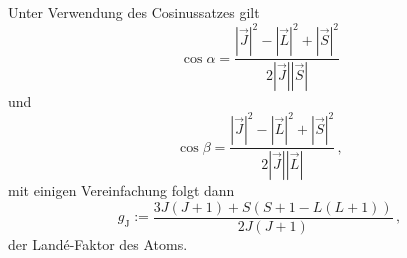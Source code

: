 Unter Verwendung des Cosinussatzes gilt
\begin{equation*}
    \cos\alpha = \dfrac{|\vec{J}|^2 - |\vec{L}|^2 + |\vec{S}|^2}{2|\vec{J}| |\vec{S}|}
\end{equation*}
und
\begin{equation*}
    \cos\beta = \dfrac{|\vec{J}|^2 - |\vec{L}|^2 + |\vec{S}|^2}{2|\vec{J}| |\vec{L}|} \,,
\end{equation*}
mit einigen Vereinfachung folgt dann
\begin{equation}
    g_\text{J} := \dfrac{3 J(J + 1) + {S(S + 1 - L(L + 1))}}{2 J(J + 1)} \,,
    \label{eq:lande-faktor}
\end{equation}
der Landé-Faktor des Atoms.


